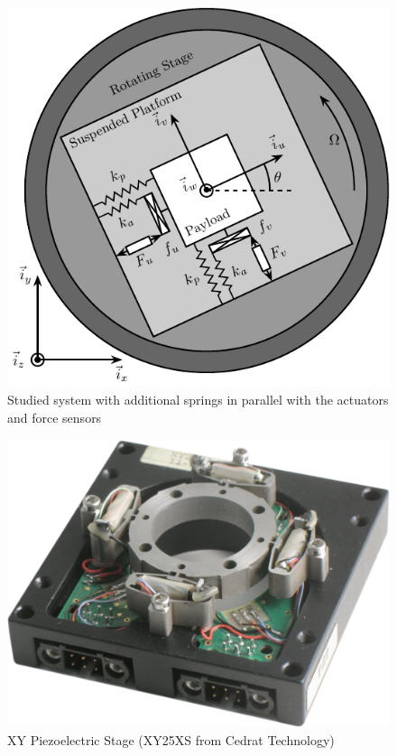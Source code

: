 \documentclass[10pt]{iopart}
\begin{document}
\begin{figure}[htbp]
\centering
\includegraphics[width=\linewidth]{figs/system_parallel_springs.pdf}
\caption{\label{fig:system_parallel_springs}Studied system with additional springs in parallel with the actuators and force sensors}
\end{figure}


\begin{figure}[htbp]
\centering
\includegraphics[width=0.8\linewidth]{figs/cedrat_xy25xs.png}
\caption{\label{fig:cedrat_xy25xs}XY Piezoelectric Stage (XY25XS from Cedrat Technology)}
\end{figure}
\end{document}
